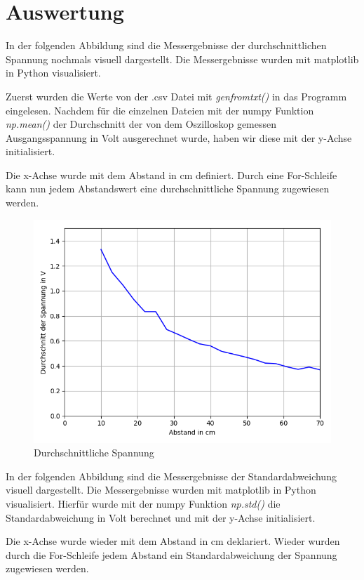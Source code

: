 \documentclass[12pt, oneside, a4paper, \docLanguage]{report}
\begin{document}
\newpage
\section{Auswertung}
\label{chap:VERSUCH_1_AUSWERTUNG}
In der folgenden Abbildung sind die Messergebnisse der durchschnittlichen Spannung nochmals visuell dargestellt. Die Messergebnisse wurden mit matplotlib in Python visualisiert.

Zuerst wurden die Werte von der .csv Datei mit \textit{genfromtxt()} in das Programm eingelesen.
Nachdem für die einzelnen Dateien mit der numpy Funktion \textit{np.mean()} der Durchschnitt der von dem Oszilloskop gemessen Ausgangsspannung in Volt ausgerechnet wurde, haben wir diese mit der y-Achse initialisiert.

Die x-Achse wurde mit dem Abstand in cm definiert. Durch eine For-Schleife kann nun jedem Abstandswert eine durchschnittliche Spannung zugewiesen werden.
\begin{figure}[H]
	\centering\small
	\includegraphics[width=\textwidth]{media/myplot.png}
	\caption{Durchschnittliche Spannung}
	\label{fig:VERSUCH_1_PLOT_DURCHSCNITTLICHE_SAPNNUNG}
\end{figure}

\newpage
In der folgenden Abbildung sind die Messergebnisse der Standardabweichung visuell dargestellt. Die Messergebnisse wurden mit matplotlib in Python visualisiert.
Hierfür wurde mit der numpy Funktion \textit{np.std()} die Standardabweichung in Volt berechnet und mit der y-Achse initialisiert.

Die x-Achse wurde wieder mit dem Abstand in cm deklariert. Wieder wurden durch die For-Schleife jedem Abstand ein Standardabweichung der Spannung zugewiesen werden.
\end{document}
